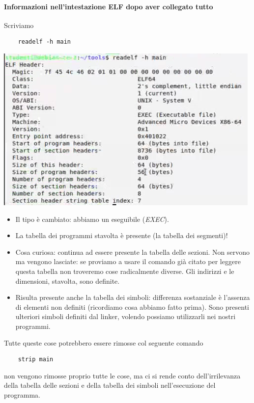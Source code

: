 \paragraph{Informazioni nell'intestazione ELF dopo aver collegato tutto} Scriviamo 
\begin{verbatim}
	readelf -h main
\end{verbatim}
\begin{center}
	\includegraphics{img/59.PNG}
\end{center}  
\begin{itemize}
	\item Il tipo è cambiato: abbiamo un eseguibile (\emph{EXEC}).
	\item La tabella dei programmi stavolta è presente (la tabella dei segmenti)!
	\item Cosa curiosa: continua ad essere presente la tabella delle sezioni. Non servono ma vengono lasciate: se proviamo a usare il comando già citato per leggere questa tabella non troveremo cose radicalmente diverse. Gli indirizzi e le dimensioni, stavolta, sono definite.
	\item Risulta presente anche la tabella dei simboli: differenza sostanziale è l'assenza di elementi non definiti (ricordiamo cosa abbiamo fatto prima). Sono presenti ulteriori simboli definiti dal linker, volendo possiamo utilizzarli nei nostri programmi.
\end{itemize}
Tutte queste cose potrebbero essere rimosse col seguente comando
\begin{verbatim}
	strip main
\end{verbatim}
non vengono rimosse proprio tutte le cose, ma ci si rende conto dell'irrilevanza della tabella delle sezioni e della tabella dei simboli nell'esecuzione del programma.

